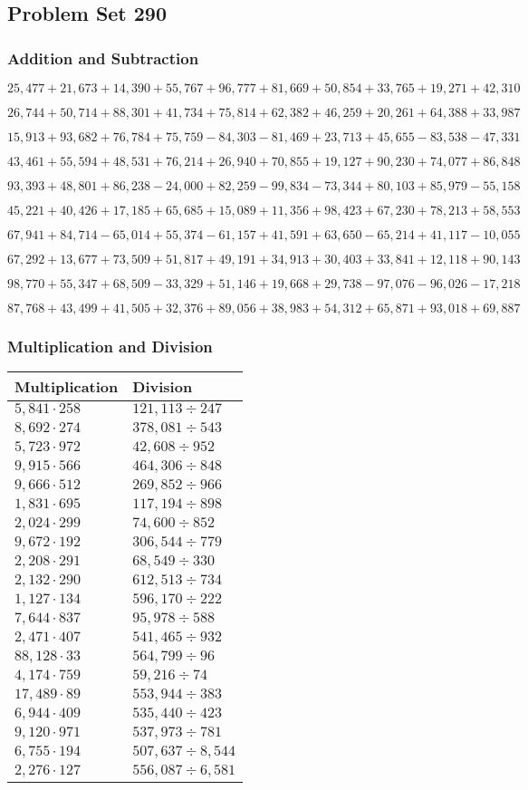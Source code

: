 \hypertarget{problem-set-290}{%
\subsection{Problem Set 290}\label{problem-set-290}}

\hypertarget{addition-and-subtraction}{%
\subsubsection{Addition and
Subtraction}\label{addition-and-subtraction}}

\(25,477+21,673+14,390+55,767+96,777+81,669+50,854+33,765+19,271+42,310\)

\(26,744+50,714+88,301+41,734+75,814+62,382+46,259+20,261+64,388+33,987\)

\(15,913+93,682+76,784+75,759-84,303-81,469+23,713+45,655-83,538-47,331\)

\(43,461+55,594+48,531+76,214+26,940+70,855+19,127+90,230+74,077+86,848\)

\(93,393+48,801+86,238-24,000+82,259-99,834-73,344+80,103+85,979-55,158\)

\(45,221+40,426+17,185+65,685+15,089+11,356+98,423+67,230+78,213+58,553\)

\(67,941+84,714-65,014+55,374-61,157+41,591+63,650-65,214+41,117-10,055\)

\(67,292+13,677+73,509+51,817+49,191+34,913+30,403+33,841+12,118+90,143\)

\(98,770+55,347+68,509-33,329+51,146+19,668+29,738-97,076-96,026-17,218\)

\(87,768+43,499+41,505+32,376+89,056+38,983+54,312+65,871+93,018+69,887\)

\hypertarget{multiplication-and-division}{%
\subsubsection{Multiplication and
Division}\label{multiplication-and-division}}

\begin{longtable}[]{@{}ll@{}}
\toprule
Multiplication & Division\tabularnewline
\midrule
\endhead
\(5,841\cdot258\) & \(121,113÷247\)\tabularnewline
\(8,692\cdot274\) & \(378,081÷543\)\tabularnewline
\(5,723\cdot972\) & \(42,608÷952\)\tabularnewline
\(9,915\cdot566\) & \(464,306÷848\)\tabularnewline
\(9,666\cdot512\) & \(269,852÷966\)\tabularnewline
\(1,831\cdot695\) & \(117,194÷898\)\tabularnewline
\(2,024\cdot299\) & \(74,600÷852\)\tabularnewline
\(9,672\cdot192\) & \(306,544÷779\)\tabularnewline
\(2,208\cdot291\) & \(68,549÷330\)\tabularnewline
\(2,132\cdot290\) & \(612,513÷734\)\tabularnewline
\(1,127\cdot134\) & \(596,170÷222\)\tabularnewline
\(7,644\cdot837\) & \(95,978÷588\)\tabularnewline
\(2,471\cdot407\) & \(541,465÷932\)\tabularnewline
\(88,128\cdot33\) & \(564,799÷96\)\tabularnewline
\(4,174\cdot759\) & \(59,216÷74\)\tabularnewline
\(17,489\cdot89\) & \(553,944÷383\)\tabularnewline
\(6,944\cdot409\) & \(535,440÷423\)\tabularnewline
\(9,120\cdot971\) & \(537,973÷781\)\tabularnewline
\(6,755\cdot194\) & \(507,637÷8,544\)\tabularnewline
\(2,276\cdot127\) & \(556,087÷6,581\)\tabularnewline
\bottomrule
\end{longtable}
